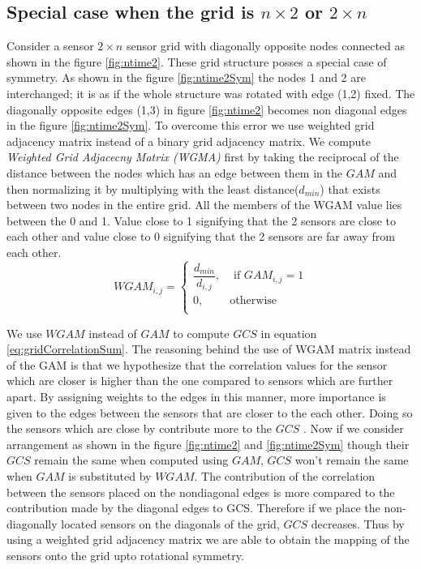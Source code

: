 \subsection{Special case when the grid is $n \times 2$ or $2 \times n$}
Consider a sensor $2 \times n$ sensor grid with diagonally opposite nodes connected as shown in the figure \ref{fig:ntime2}. These grid structure posses a special case of symmetry. As shown in the  figure \ref{fig:ntime2Sym} the nodes 1 and 2 are interchanged; it is as if the whole structure was rotated with  edge (1,2) fixed. The diagonally opposite edges (1,3) in figure \ref{fig:ntime2} becomes non diagonal edges in the figure \ref{fig:ntime2Sym}. To overcome this error we use weighted grid adjacency matrix instead of a binary grid adjacency matrix. We compute \textit{Weighted Grid Adjacecny Matrix (WGMA)} first by taking the reciprocal of the distance between the nodes which has an edge between them in the $GAM$ and then normalizing it by multiplying with the least distance($d_{min}$) that exists between two nodes in the entire grid. All the members of the WGAM value lies between the 0 and 1. Value close to 1 signifying that the 2 sensors are close to each other and value close to 0 signifying that the 2 sensors are far away from each other.\\
\[
WGAM_{i,j} = 
\begin{cases}
\dfrac{d_{min}}{d_{i,j}}, &\text{ if } GAM_{i,j} = 1\\
0, & \text{otherwise}\\
\end{cases}
\]


We use $WGAM$ instead of $GAM$ to compute $GCS$ in equation \ref{eq:gridCorrelationSum}. The reasoning behind the use of WGAM matrix instead of the GAM is that we hypothesize that the correlation values for the sensor which are closer is higher than the one compared to sensors which are further apart. By assigning weights to the edges in this manner, more importance is given to the edges between the sensors that are closer to the each other. Doing so the sensors which are close by contribute  more to the $GCS$ . 
Now if we consider arrangement as shown in the figure \ref{fig:ntime2} and \ref{fig:ntime2Sym} though their $GCS$ remain the same when computed using $GAM$, $GCS$ won't remain the same when $GAM$ is substituted by $WGAM$. The contribution of the correlation between the sensors placed on the nondiagonal edges is more compared to the contribution made by the diagonal edges to GCS. Therefore if we place the non-diagonally located sensors on the diagonals of the grid, $GCS$ decreases. Thus by using a weighted grid adjacency matrix we are able to obtain the mapping of the sensors onto the grid upto rotational symmetry.

